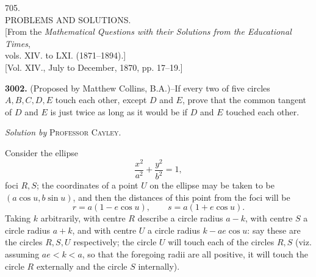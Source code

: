 \documentclass[10pt]{article}
\begin{document}
\setcounter{page}{566}
\small

\begin{center}
{\large 705.}\\[1.2em]
{\large PROBLEMS AND SOLUTIONS.}\\[1.0em]
[From the \emph{Mathematical Questions with their Solutions from the Educational Times},\\
vols. XIV. to LXI. (1871--1894).]\\[1.0em]
[Vol. XIV., July to December, 1870, pp. 17--19.]
\end{center}

\noindent
\textbf{3002.} (Proposed by Matthew Collins, B.A.)--If every two of five circles
$A,B,C,D,E$ touch each other, except $D$ and $E$, prove that the common tangent
of $D$ and $E$ is just twice as long as it would be if $D$ and $E$ touched
each other.

\begin{center}
\emph{Solution by} \textsc{Professor Cayley}.
\end{center}

\noindent
Consider the ellipse
\[
        \frac{x^2}{a^2}+\frac{y^2}{b^2}=1,
\]
foci $R,S$; the coordinates of a point $U$ on the ellipse may be taken to be
$(a\cos u,b\sin u)$, and then the distances of this point from the foci will be
\[
        r=a(1-e\cos u),\qquad s=a(1+e\cos u).
\]
Taking $k$ arbitrarily, with centre $R$ describe a circle radius $a-k$, with
centre $S$ a circle radius $a+k$, and with centre $U$ a circle radius
$k-ae\cos u$: say these are the circles $R,S,U$ respectively; the circle $U$
will touch each of the circles $R,S$ (viz. assuming $ae<k<a$, so that the
foregoing radii are all positive, it will touch the circle $R$ externally and
the circle $S$ internally).
\end{document}
